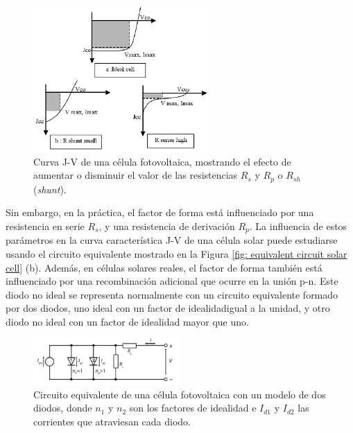 \documentclass[12pt]{article}
\begin{document}
	\pagebreak
	
	\begin{figure}[h]
		\begin{center}
			\includegraphics[width=0.6\textwidth]{img/JV_curve_withRsRp.png}
			\caption{Curva J-V de una célula fotovoltaica, mostrando el efecto de aumentar o disminuir el valor de las resistencias $R_{s}$ y $R_{p}$ o $R_{sh}$ (\textit{shunt}).}
			\label{fig: JV curve with non-ideal model (one diode)}
		\end{center}
	\end{figure}

	\noindent Sin embargo, en la práctica, el factor de forma está influenciado por una resistencia en serie $R_{s}$, y una resistencia de derivación $R_{p}$. La influencia de estos parámetros en la curva característica J-V de una célula solar puede estudiarse usando el circuito equivalente mostrado en la Figura \ref{fig: equivalent circuit solar cell} (b). Además, en células solares reales, el factor de forma también está influenciado por una recombinación adicional que ocurre en la unión p-n. Este diodo no ideal se representa normalmente con un circuito equivalente formado por dos diodos, uno ideal con un factor de idealidad\footnotemark \enspace igual a la unidad, y otro diodo no ideal con un factor de idealidad mayor que uno. \\
	

	
	\begin{figure}[h]
		\begin{center}
			\includegraphics[width=0.5\textwidth]{img/nonIdeal_equivCircuit_solarCell.png}
			\caption{Circuito equivalente de una célula fotovoltaica con un modelo de dos diodos, donde $n_{1}$ y $n_{2}$ son los factores de idealidad e $I_{d1}$ y $I_{d2}$ las corrientes que atraviesan cada diodo.}
			\label{fig: non-Ideal equivalent circuit solar cell}
		\end{center}
	\end{figure}	
	
\end{document}
